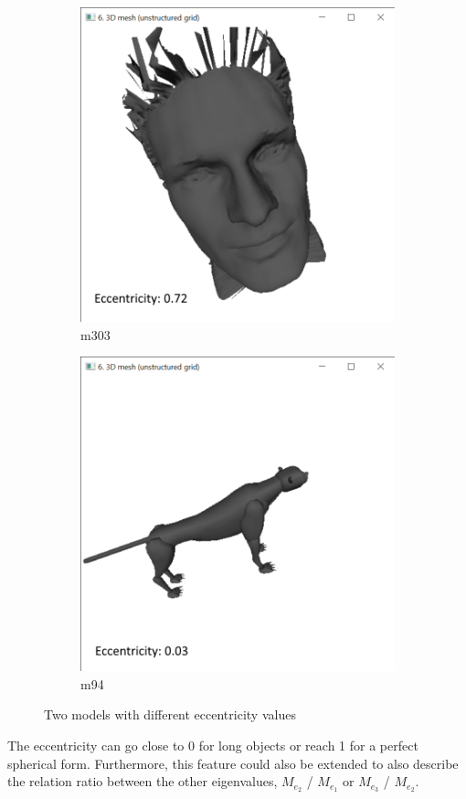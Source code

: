 \documentclass{bigdata}
\begin{document}
\begin{figure}[h!]
  \centering
  \begin{subfigure}[b]{0.4\linewidth}
    \includegraphics[width=\linewidth]{Pictures/Part3/eccHead.png}
    \caption{m303}
  \end{subfigure}
  \begin{subfigure}[b]{0.4\linewidth}
    \includegraphics[width=\linewidth]{Pictures/Part3/eccLeo.png}
    \caption{m94}
  \end{subfigure}
  \caption{Two models with different eccentricity values}
  \label{fig:eccentricity}
\end{figure}
The eccentricity can go close to 0 for long objects or reach 1 for a perfect spherical form. Furthermore, this feature could also be extended to also describe the relation ratio between the other eigenvalues, $M_{e_2}$ / $M_{e_1}$ or $M_{e_3}$ / $M_{e_2}$. 
\end{document}
